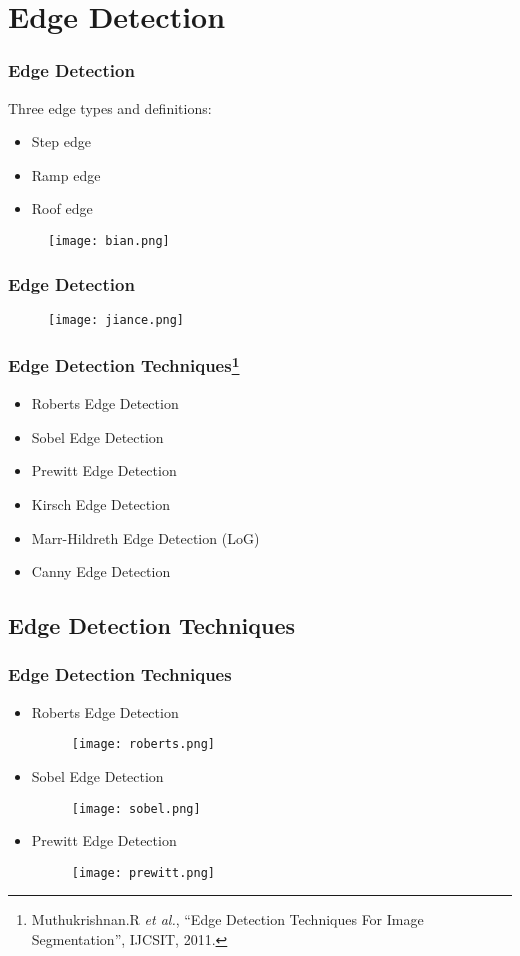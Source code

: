 \documentclass[notheorems,serif,table,compress]{beamer}  %
\begin{document}
\section{Edge Detection}
\begin{frame}
\frametitle{Edge Detection}
Three edge types and definitions:
\begin{itemize}
\item Step edge
\item Ramp edge
\item Roof edge
\end{itemize}
    \begin{figure}
    \texttt{[image: bian.png]} 
    \end{figure}
\end{frame}

\begin{frame}
\frametitle{Edge Detection}
    \begin{figure}
    \texttt{[image: jiance.png]} 
    \end{figure}
\end{frame}


\begin{frame}
\frametitle{Edge Detection Techniques\footnote{Muthukrishnan.R \textit{et al.}, ``Edge Detection Techniques For 
Image Segmentation'', IJCSIT, 2011. }}
\begin{itemize}
\item Roberts Edge Detection
\item Sobel Edge Detection
\item Prewitt Edge Detection
\item Kirsch Edge Detection
\item Marr-Hildreth Edge Detection (LoG)
\item Canny Edge Detection
\end{itemize}
\end{frame}

\subsection{Edge Detection Techniques}
\begin{frame}        
\frametitle{Edge Detection Techniques}
\begin{itemize}
\item Roberts Edge Detection
    \begin{figure}
    \texttt{[image: roberts.png]} 
    \end{figure}
\item Sobel Edge Detection
    \begin{figure}
    \texttt{[image: sobel.png]} 
    \end{figure}
\item Prewitt Edge Detection
    \begin{figure}
    \texttt{[image: prewitt.png]} 
    \end{figure}
\end{itemize}
\end{frame}
\end{document}
